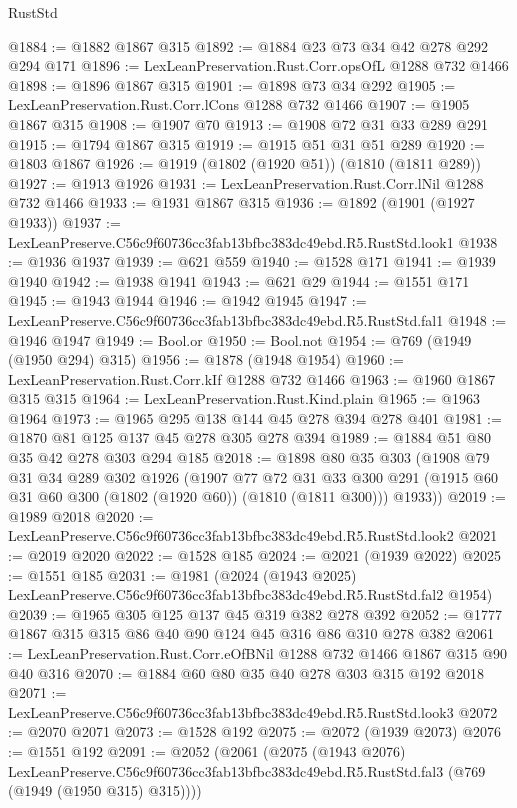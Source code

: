 \begin{lexlean}{RustStd}
\begin{coremodule}
@1884 := @1882 @1867 @315
@1892 := @1884 @23 @73 @34 @42 @278 @292 @294 @171
@1896 := LexLeanPreservation.Rust.Corr.opsOfL @1288 @732 @1466
@1898 := @1896 @1867 @315
@1901 := @1898 @73 @34 @292
@1905 := LexLeanPreservation.Rust.Corr.lCons @1288 @732 @1466
@1907 := @1905 @1867 @315
@1908 := @1907 @70
@1913 := @1908 @72 @31 @33 @289 @291
@1915 := @1794 @1867 @315
@1919 := @1915 @51 @31 @51 @289
@1920 := @1803 @1867
@1926 := @1919 (@1802 (@1920 @51)) (@1810 (@1811 @289))
@1927 := @1913 @1926
@1931 := LexLeanPreservation.Rust.Corr.lNil @1288 @732 @1466
@1933 := @1931 @1867 @315
@1936 := @1892 (@1901 (@1927 @1933))
@1937 := LexLeanPreserve.C56c9f60736cc3fab13bfbc383dc49ebd.R5.RustStd.look1
@1938 := @1936 @1937
@1939 := @621 @559
@1940 := @1528 @171
@1941 := @1939 @1940
@1942 := @1938 @1941
@1943 := @621 @29
@1944 := @1551 @171
@1945 := @1943 @1944
@1946 := @1942 @1945
@1947 := LexLeanPreserve.C56c9f60736cc3fab13bfbc383dc49ebd.R5.RustStd.fal1
@1948 := @1946 @1947
@1949 := Bool.or
@1950 := Bool.not
@1954 := @769 (@1949 (@1950 @294) @315)
@1956 := @1878 (@1948 @1954)
@1960 := LexLeanPreservation.Rust.Corr.kIf @1288 @732 @1466
@1963 := @1960 @1867 @315 @315
@1964 := LexLeanPreservation.Rust.Kind.plain
@1965 := @1963 @1964
@1973 := @1965 @295 @138 @144 @45 @278 @394 @278 @401
@1981 := @1870 @81 @125 @137 @45 @278 @305 @278 @394
@1989 := @1884 @51 @80 @35 @42 @278 @303 @294 @185
@2018 := @1898
    @80
    @35
    @303
    (@1908
      @79
      @31
      @34
      @289
      @302
      @1926
      (@1907
        @77
        @72
        @31
        @33
        @300
        @291
        (@1915 @60 @31 @60 @300 (@1802 (@1920 @60)) (@1810 (@1811 @300)))
        @1933))
@2019 := @1989 @2018
@2020 := LexLeanPreserve.C56c9f60736cc3fab13bfbc383dc49ebd.R5.RustStd.look2
@2021 := @2019 @2020
@2022 := @1528 @185
@2024 := @2021 (@1939 @2022)
@2025 := @1551 @185
@2031 := @1981
    (@2024 (@1943 @2025) LexLeanPreserve.C56c9f60736cc3fab13bfbc383dc49ebd.R5.RustStd.fal2 @1954)
@2039 := @1965 @305 @125 @137 @45 @319 @382 @278 @392
@2052 := @1777 @1867 @315 @315 @86 @40 @90 @124 @45 @316 @86 @310 @278 @382
@2061 := LexLeanPreservation.Rust.Corr.eOfBNil @1288 @732 @1466 @1867 @315 @90 @40 @316
@2070 := @1884 @60 @80 @35 @40 @278 @303 @315 @192 @2018
@2071 := LexLeanPreserve.C56c9f60736cc3fab13bfbc383dc49ebd.R5.RustStd.look3
@2072 := @2070 @2071
@2073 := @1528 @192
@2075 := @2072 (@1939 @2073)
@2076 := @1551 @192
@2091 := @2052
    (@2061
      (@2075
        (@1943 @2076)
        LexLeanPreserve.C56c9f60736cc3fab13bfbc383dc49ebd.R5.RustStd.fal3
        (@769 (@1949 (@1950 @315) @315))))

\end{coremodule}
\end{lexlean}
